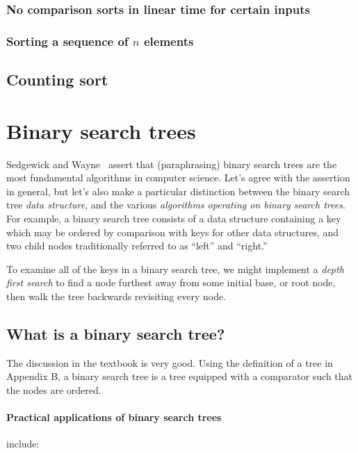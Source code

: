 \documentclass{article}
\begin{document}
\subsubsection{No comparison sorts in linear time for certain inputs}

\subsubsection{Sorting a sequence of $n$ elements}

\subsection{Counting sort}

\setcounter{section}{11}
\section{Binary search trees}

Sedgewick and Wayne~\cite{sedgewick:r2011} assert that (paraphrasing)
binary search trees are the most fundamental algorithms
in computer science. Let's agree with the assertion in
general, but let's also make a particular distinction between the
binary search tree \emph{data structure}, and the various
\emph{algorithms operating on binary search trees}. For example,
a binary search tree consists of a data structure containing a key
which may be ordered by comparison with keys for other data structures,
and two child nodes traditionally referred to as ``left'' and ``right.''

To examine all of the keys in a binary search tree, we might
implement a \emph{depth first search} to find a node furthest
away from some initial base, or root node, then walk the tree
backwards revisiting every node.



\subsection{What is a binary search tree?}

The discussion in the textbook is very good. Using the definition of
a tree in Appendix B, a binary search tree is a tree equipped with
a comparator such that the nodes are ordered.

\paragraph{Practical applications of binary search trees} include:
\end{document}
